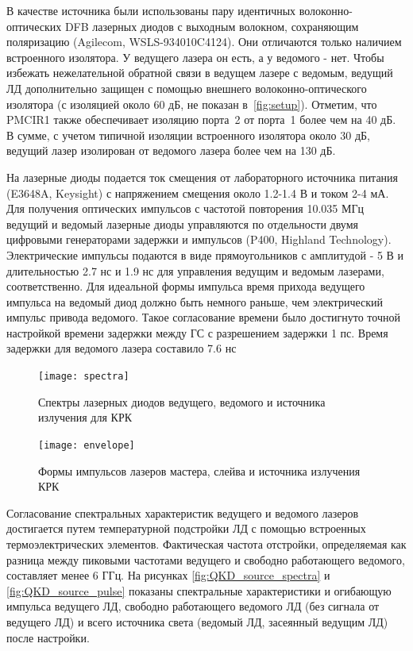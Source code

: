 В качестве источника были использованы пару идентичных волоконно-оптических DFB лазерных диодов с выходным волокном, сохраняющим поляризацию (Agilecom, WSLS-934010C4124). Они отличаются только наличием встроенного изолятора. У ведущего лазера он есть, а у ведомого - нет. Чтобы избежать нежелательной обратной связи в ведущем лазере с ведомым, ведущий ЛД дополнительно защищен с помощью внешнего волоконно-оптического изолятора (с изоляцией около 60 дБ, не показан в~\cref{fig:setup}). Отметим, что PMCIR1 также обеспечивает изоляцию порта~2 от порта~1 более чем на 40 дБ. В сумме, с учетом типичной изоляции встроенного изолятора около 30 дБ, ведущий лазер изолирован от ведомого лазера более чем на 130 дБ.
 
На лазерные диоды подается ток смещения от лабораторного источника питания (E3648A, Keysight) с напряжением смещения около 1.2-1.4 В и током 2-4 мА. Для получения оптических импульсов с частотой повторения 10.035 МГц ведущий и ведомый лазерные диоды управляются по отдельности двумя цифровыми генераторами задержки и импульсов (P400, Highland Technology). Электрические импульсы подаются в виде прямоугольников с амплитудой - 5 В и длительностью 2.7 нс и 1.9 нс для управления ведущим и ведомым лазерами, соответственно. Для идеальной формы импульса время прихода ведущего импульса на ведомый диод должно быть немного раньше, чем электрический импульс привода ведомого. Такое согласование времени было достигнуто точной настройкой времени задержки между ГС с разрешением задержки 1 пс. Время задержки для ведомого лазера составило 7.6 нс
\begin{figure}
	\centering
	\texttt{[image: spectra]}
	\caption{Спектры лазерных диодов ведущего, ведомого и источника излучения для КРК}
\end{figure}\label{fig:QKD_source_spectra}

\begin{figure}
	\centering
	\texttt{[image: envelope]}
	\caption{Формы импульсов лазеров мастера, слейва и источника излучения КРК}
\end{figure}\label{fig:QKD_source_pulse}

Согласование спектральных характеристик ведущего и ведомого лазеров достигается путем температурной подстройки ЛД с помощью встроенных термоэлектрических элементов. Фактическая частота отстройки, определяемая как разница между пиковыми частотами ведущего и свободно работающего ведомого, составляет менее 6 ГГц. На рисунках \ref{fig:QKD_source_spectra} и \ref{fig:QKD_source_pulse} показаны спектральные характеристики и огибающую импульса ведущего ЛД, свободно работающего ведомого ЛД (без сигнала от ведущего ЛД) и всего источника света (ведомый ЛД, засеянный ведущим ЛД) после настройки. 

